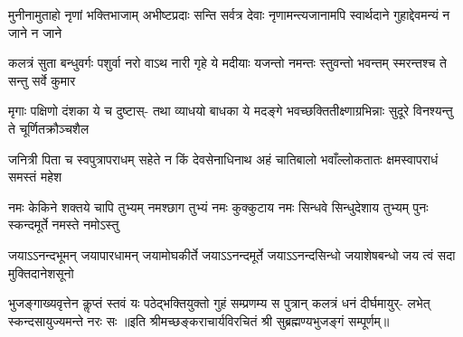 \fourlineindentedshloka
{मुनीनामुताहो नृणां भक्तिभाजाम्}
{अभीष्टप्रदाः सन्ति सर्वत्र देवाः}
{नृणामन्त्यजानामपि स्वार्थदाने}
{गुहाद्देवमन्यं न जाने न जाने}

\fourlineindentedshloka
{कलत्रं सुता बन्धुवर्गः पशुर्वा}
{नरो वाऽथ नारी गृहे ये मदीयाः}
{यजन्तो नमन्तः स्तुवन्तो भवन्तम्}
{स्मरन्तश्च ते सन्तु सर्वे कुमार}

\fourlineindentedshloka
{मृगाः पक्षिणो दंशका ये च दुष्टास्-}
{तथा व्याधयो बाधका ये मदङ्गे}
{भवच्छक्तितीक्ष्णाग्रभिन्नाः सुदूरे}
{विनश्यन्तु ते चूर्णितक्रौञ्चशैल}

\fourlineindentedshloka
{जनित्री पिता च स्वपुत्रापराधम्}
{सहेते न किं देवसेनाधिनाथ}
{अहं चातिबालो भवाँल्लोकतातः}
{क्षमस्वापराधं समस्तं महेश}

\fourlineindentedshloka
{नमः केकिने शक्तये चापि तुभ्यम्}
{नमश्छाग तुभ्यं नमः कुक्कुटाय}
{नमः सिन्धवे सिन्धुदेशाय तुभ्यम्}
{पुनः स्कन्दमूर्ते नमस्ते नमोऽस्तु}

\fourlineindentedshloka
{जयाऽऽनन्दभूमन् जयापारधामन्}
{जयामोघकीर्ते जयाऽऽनन्दमूर्ते}
{जयाऽऽनन्दसिन्धो जयाशेषबन्धो}
{जय त्वं सदा मुक्तिदानेशसूनो}

\fourlineindentedshloka
{भुजङ्गाख्यवृत्तेन कॢप्तं स्तवं यः}
{पठेद्भक्तियुक्तो गुहं सम्प्रणम्य}
{स पुत्रान् कलत्रं धनं दीर्घमायुर्-}
{लभेत् स्कन्दसायुज्यमन्ते नरः सः}
॥इति  श्रीमच्छङ्कराचार्यविरचितं श्री सुब्रह्मण्यभुजङ्गं सम्पूर्णम्॥
